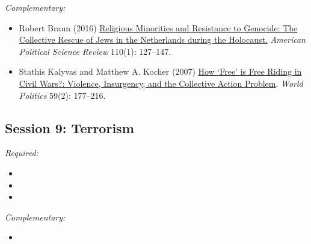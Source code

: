 \documentclass[12pt, a4paper]{article}
\begin{document}
\noindent\textit{Complementary:}

\begin{itemize}
  \item Robert Braun (2016) \href{https://doi.org/10.1017/S0003055415000544}{Religious Minorities and Resistance to Genocide: The Collective Rescue of Jews in the Netherlands during the Holocaust.} \textit{American Political Science Review} 110(1): 127--147.
  \item Stathis Kalyvas and Matthew A. Kocher (2007) \href{https://doi.org/10.1353/wp.2007.0023}{How `Free' is Free Riding in Civil Wars?: Violence, Insurgency, and the Collective Action Problem}. \textit{World Politics} 59(2): 177--216.
\end{itemize}

\vspace{20pt}
\hline
\subsection*{Session 9: Terrorism}

\noindent\textit{Required:}







\begin{itemize}
  \item
  \item
  \item
\end{itemize}

\noindent\textit{Complementary:}

\begin{itemize}
  \item
\end{itemize}

\vspace{20pt}
\hline
\end{document}
